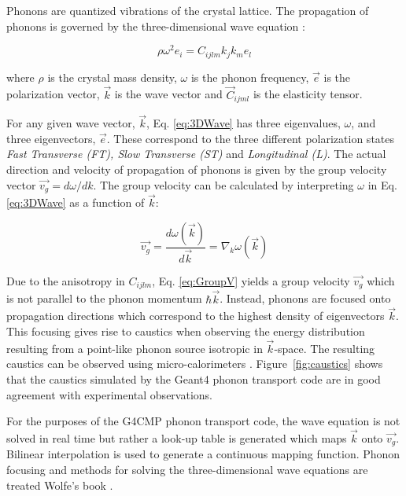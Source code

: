 \documentclass[preprint,12pt]{elsarticle}
\begin{document}
Phonons are quantized vibrations of the crystal lattice. The propagation of phonons is governed by the three-dimensional wave equation \cite{Wolfe}:

\begin{equation}
\label{eq:3DWave}
\rho \omega ^2e_i=C_{ijlm}k_jk_me_l
\end{equation}

where $\rho$ is the crystal mass density, $\omega$ is the phonon frequency, $\vec{e}$ is the polarization vector, $\vec{k}$ is the wave vector and $\vec{C}_{ijml}$ is the elasticity tensor.

For any given wave vector, $\vec{k}$, Eq. \ref{eq:3DWave} has three eigenvalues, $\omega$, and three eigenvectors, $\vec{e}$. These correspond to the three different polarization states \textit{Fast Transverse (FT), Slow Transverse (ST)} and \textit{Longitudinal (L)}. The actual direction and velocity of propagation of phonons is given by the group velocity vector $\vec{v_g} = d\omega/dk$. The group velocity can be calculated by interpreting $\omega$ in Eq. \ref{eq:3DWave} as a function of $\vec{k}$:

\begin{equation}
\label{eq:GroupV}
\vec{v_g}=\frac{d \omega (\vec{k})}{d\vec{k}}=\nabla_k \omega (\vec{k})
\end{equation}

Due to the anisotropy in $C_{ijlm}$, Eq. \ref{eq:GroupV} yields a group velocity $\vec{v_g}$ which is not parallel to the phonon momentum $\hbar\vec{k}$. Instead, phonons are focused onto propagation directions which correspond to the highest density of eigenvectors $\vec{k}$. This focusing gives rise to caustics when observing the energy  distribution resulting from a point-like phonon source isotropic in $\vec{k}$-space. The resulting caustics can be observed using micro-calorimeters \cite{Nothrop}. Figure~\ref{fig:caustics} shows that the caustics simulated by the Geant4 phonon transport code are in good agreement with experimental observations. 

For the purposes of the G4CMP phonon transport code, the wave equation is not solved in real time but rather a look-up table is generated which maps $\vec{k}$ onto $\vec{v_g}$. Bilinear interpolation is used to generate a continuous mapping function. Phonon focusing and methods for solving the three-dimensional wave equations are treated Wolfe's book \cite{Wolfe}. %
\end{document}
